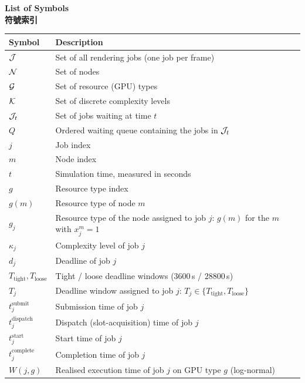 \newpage
{}

\begin{center}
{\Huge \textbf{List of Symbols}}\\[0.3em]
{\LARGE \textbf{符號索引}}
\end{center}

\vspace{20pt}

\begin{longtable}{l>{\raggedright\arraybackslash}p{10cm}}
\toprule
\textbf{Symbol} & \textbf{Description} \\
\midrule
\endhead
\bottomrule
\endfoot
$\mathcal{J}$ & Set of all rendering jobs (one job per frame) \\
$\mathcal{N}$ & Set of nodes \\
$\mathcal{G}$ & Set of resource (GPU) types \\
$\mathcal{K}$ & Set of discrete complexity levels \\
$\mathcal{J}_t$ & Set of jobs waiting at time $t$ \\
$Q$ & Ordered waiting queue containing the jobs in $\mathcal{J}_t$ \\
$j$ & Job index \\
$m$ & Node index \\
$t$ & Simulation time, measured in seconds \\
$g$ & Resource type index \\
$g(m)$ & Resource type of node $m$ \\
$g_j$ & Resource type of the node assigned to job $j$: $g(m)$ for the $m$ with $x_j^m = 1$ \\
$\kappa_j$ & Complexity level of job $j$ \\
$d_j$ & Deadline of job $j$ \\
$T_{\text{tight}}, T_{\text{loose}}$ & Tight / loose deadline windows ($3600$\,s / $28800$\,s) \\
$T_j$ & Deadline window assigned to job $j$: $T_j \in \{T_{\text{tight}}, T_{\text{loose}}\}$ \\
$t_j^{\text{submit}}$ & Submission time of job $j$ \\
$t_j^{\text{dispatch}}$ & Dispatch (slot-acquisition) time of job $j$ \\
$t_j^{\text{start}}$ & Start time of job $j$ \\
$t_j^{\text{complete}}$ & Completion time of job $j$ \\
$W(j,g)$ & Realised execution time of job $j$ on GPU type $g$ (log-normal) \\

\end{longtable}
